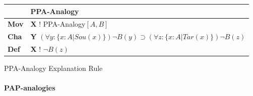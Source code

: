 					\begin{Scheme}[H]\footnotesize
               		\centering
               		\begin{tabular}{l l}
               			                   & \textbf{PPA-Analogy}                                                                                                                                                                                                                                                                               \\ \toprule
               			\textbf{Mov}      & \textbf{X} ! PPA-Analogy$[A,B]$                                                                                                                                                                                                                                                                                     \\ \midrule
               			\textbf{Cha} & \textbf{Y} $(\forall y: \{ x: A| Sou(x)\} ) \neg B(y) \supset (\forall z : \{ x: A| Tar(x)\} ) \neg B(z)$                                                                                                                                                                                                                                                                                          \\ \midrule
               			\textbf{Def}   & \textbf{X} ! $\neg B(z)$ \\ \bottomrule
               		\end{tabular}
               		\caption{PPA-Analogy Explanation Rule}
               		\label{PPAAnalogyExplanation}
					\end{Scheme}
			
			\newpage
			\paragraph{PAP-analogies}
			
